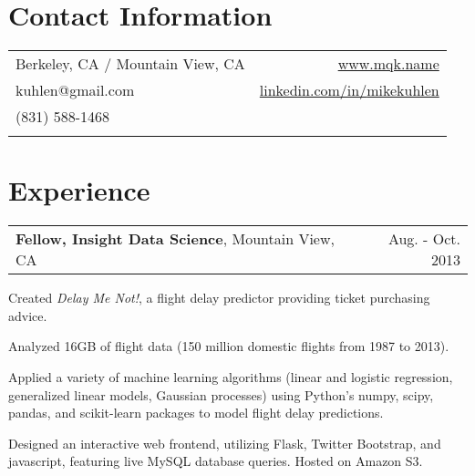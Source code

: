 \begin{resume}

\vspace*{0.15in}

\section{\sc Contact Information}
\vspace*{.05in}
\begin{tabularx}{\textwidth}{Xr}
Berkeley, CA / Mountain View, CA         & \url{www.mqk.name} \\
kuhlen@gmail.com                         & \url{linkedin.com/in/}$\!$\url{mikekuhlen} \\
(831) 588-1468 \\                        & \\
\end{tabularx}

\vspace*{-0.15in}
\section{\sc Experience}
\hspace*{-0.1in}
\begin{tabularx}{1.025\textwidth}{Xr}
\textbf{Fellow, Insight Data Science}, Mountain View, CA & Aug. - Oct. 2013
\end{tabularx}
\vspace*{-0.1in}
\begin{list1}
\item Created \textit{Delay Me Not!}, a flight delay predictor providing ticket purchasing advice.
\item Analyzed 16GB of flight data (150 million domestic flights from 1987 to 2013).
\item Applied a variety of machine learning algorithms (linear and logistic regression, generalized linear models, Gaussian processes) using Python's numpy, scipy, pandas, and scikit-learn packages to model flight delay predictions.
\item Designed an interactive web frontend, utilizing Flask, Twitter Bootstrap, and javascript, featuring live MySQL database queries. Hosted on Amazon S3.
\end{list1}




\end{resume}
